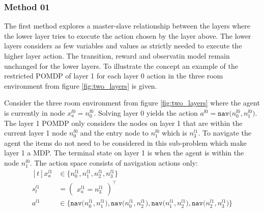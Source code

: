 \subsubsection{Method 01}\label{subsec:M1}
The first method explores a master-slave relationship between the layers where the lower layer tries to execute the action chosen by the layer above. The lower layers considers as few variables and values as strictly needed to execute the higher layer action. The transition, reward and observatin model remain unchanged for the lower layers. To illustrate the concept an example of the restricted POMDP of layer 1 for each layer 0 action in the three room environment from figure \ref{fig:two_layers} is given.
\begin{example}\label{ex:M1_nav}
Consider the three room environment from figure \ref{fig:two_layers} where the agent is currently in node $x_a^{l0}=n_0^{l0}$. Solving layer 0 yields the action $a^{l0}=\texttt{nav($n_0^{l0},n_1^{l0}$)}$. The layer 1 POMDP only considers the nodes on layer 1 that are within the current layer 1 node $n_0^{l0}$ and the entry node to $n_1^{l0}$ which is $n_3^{l1}$. To navigate the agent the items do not need to be considered in this sub-problem which make layer 1 a MDP. The terminal state on layer 1 is when the agent is within the node $n_1^{l0}$. The action space consists of navigation actions only:
\begin{equation}
     \begin{aligned}[t] 
        x_a^{l1} &\in \big\{n_0^{l1}, n_1^{l1}, n_2^{l1}, n_3^{l1}  \big\} \\
        s_t^{l1} &= \begin{pmatrix}x_a^{l1}=n_3^{l1} \end{pmatrix}^\intercal\\
        a^{l1} &\in \big\{\texttt{nav($n_0^{l1}, n_1^{l1}$)}, \texttt{nav($n_0^{l1}, n_2^{l1}$)}, \texttt{nav($n_1^{l1}, n_2^{l1}$)},\texttt{nav($n_2^{l1}, n_3^{l1}$)} \big\}
    \end{aligned}
\end{equation}
\demo
\end{example}

